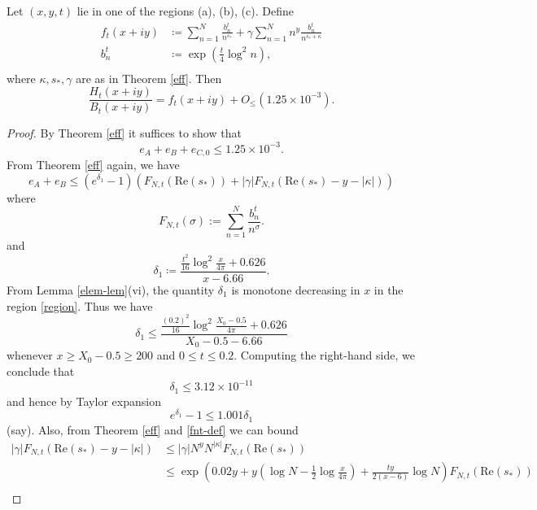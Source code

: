\begin{proposition}\label{sweep}  Let $(x,y,t)$ lie in one of the regions (a), (b), (c).
Define
\begin{align*}
f_t(x+iy) &\coloneqq \sum_{n=1}^N \frac{b_n^t}{n^{s_*}} + \gamma \sum_{n=1}^N n^y \frac{b_n^t}{n^{\overline{s_*} + \kappa}}\\
b_n^t &\coloneqq \exp( \frac{t}{4} \log^2 n),\\
\end{align*}
where $\kappa, s_*, \gamma$ are as in Theorem \ref{eff}.  Then
\begin{equation}\label{bbb}
\frac{H_t(x+iy)}{B_t(x+iy)} = f_t(x+iy) + O_{\leq}( 1.25 \times 10^{-3} ).
\end{equation}
\end{proposition}

\begin{proof} 
By Theorem \ref{eff} it suffices to show that
$$ e_A + e_B + e_{C,0} \leq 1.25 \times 10^{-3}.$$
From Theorem \ref{eff} again, we have
\begin{equation}\label{eaeb-bound}
 e_A + e_B \leq (e^{\delta_1}-1) (F_{N,t}(\mathrm{Re}(s_*)) + |\gamma| F_{N,t}( \mathrm{Re}(s_*) - y - |\kappa| ) )
\end{equation}
where
\begin{equation}\label{fnt-def}
 F_{N,t}( \sigma ) := \sum_{n=1}^N \frac{b_n^t}{n^\sigma}.
\end{equation}
and
\begin{equation}\label{dela}
 \delta_1 \coloneqq \frac{\frac{t^2}{16} \log^2 \frac{x}{4\pi} + 0.626}{x-6.66}.
\end{equation}
From Lemma \ref{elem-lem}(vi), the quantity $\delta_1$ is monotone decreasing in $x$ in the region \eqref{region}.  Thus we have
\begin{equation}\label{delta1-bound}
 \delta_1 \leq \frac{\frac{(0.2)^2}{16} \log^2 \frac{X_0-0.5}{4\pi} + 0.626}{X_0-0.5-6.66}
\end{equation}
whenever $x \geq X_0-0.5 \geq 200$ and $0 \leq t \leq 0.2$.  Computing the right-hand side, we conclude that
$$  \delta_1 \leq 3.12 \times 10^{-11}$$
and hence by Taylor expansion
$$ e^{\delta_1} - 1 \leq 1.001 \delta_1$$
(say).
Also, from Theorem \ref{eff} and \eqref{fnt-def} we can bound
\begin{align*}
|\gamma| F_{N,t}( \mathrm{Re}(s_*) - y - |\kappa| ) &\leq |\gamma| N^y N^{|\kappa|} F_{N,t}( \mathrm{Re}(s_*) ) \\
&\leq \exp\left( 0.02 y + y \left(\log N - \frac{1}{2} \log \frac{x}{4\pi}\right) + \frac{ty}{2(x-6)} \log N \right) F_{N,t}( \mathrm{Re}(s_*) )  \\

\end{align*}
\end{proof}
